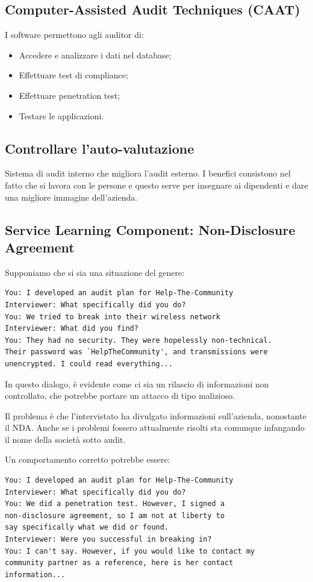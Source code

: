 \subsection{Computer-Assisted Audit Techniques (CAAT)}

I software permettono agli auditor di:
\begin{itemize}
\item Accedere e analizzare i dati nel database;
\item Effettuare test di compliance;
\item Effettuare penetration test;
\item Testare le applicazioni.
\end{itemize}


\subsection{Controllare l'auto-valutazione}

Sistema di audit interno che migliora l'audit esterno. I benefici consistono
nel fatto che si lavora con le persone e questo serve per insegnare ai
dipendenti e dare una migliore immagine dell'azienda.


\subsection{Service Learning Component: Non-Disclosure Agreement}

Supponiamo che si sia una situazione del genere:

\begin{verbatim}
You: I developed an audit plan for Help-The-Community
Interviewer: What specifically did you do?
You: We tried to break into their wireless network
Interviewer: What did you find?
You: They had no security. They were hopelessly non-technical.
Their password was `HelpTheCommunity', and transmissions were
unencrypted. I could read everything...
\end{verbatim}

In questo dialogo, è evidente come ci sia un rilascio di informazioni non
controllato, che potrebbe portare un attacco di tipo malizioso.

Il problema è che l'intervistato ha divulgato informazioni sull'azienda,
nonostante il NDA. Anche se i problemi fossero attualmente risolti sta comunque
infangando il nome della società sotto audit.


Un comportamento corretto potrebbe essere:
\begin{verbatim}
You: I developed an audit plan for Help-The-Community
Interviewer: What specifically did you do?
You: We did a penetration test. However, I signed a
non-disclosure agreement, so I am not at liberty to
say specifically what we did or found.
Interviewer: Were you successful in breaking in?
You: I can't say. However, if you would like to contact my
community partner as a reference, here is her contact
information...
\end{verbatim}

